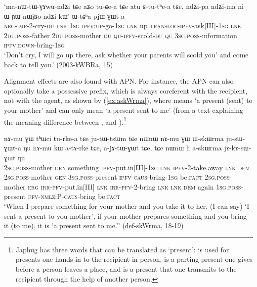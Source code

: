 \begin{exe}
\ex \label{ex:WtCha.pjWGWta}
\gll `ma-nɯ-tɯ-ɣɤwu-ndʑi tɕe aʑo tu-ɕe-a tɕe atu ɕ-tu-tʰe-a tɕe,
ndʑi-pa ndʑi-ma ni ɯ-ɲɯ-nɯjʁo-ndʑi kɯ' ɯ-tɕʰa pjɯ-ɣɯt-a \\
\textsc{neg}-\textsc{imp}-2-cry-\textsc{du} \textsc{lnk} \textsc{1sg} \textsc{ipfv}:\textsc{up}-go-\textsc{1sg} \textsc{lnk} up \textsc{transloc}-\textsc{ipfv}-ask[III]-\textsc{1sg} \textsc{lnk} \textsc{2du}.\textsc{poss}-father \textsc{2du}.\textsc{poss}-mother \textsc{du} \textsc{qu}-\textsc{ipfv}-scold-\textsc{du} \textsc{qu} \textsc{3sg}.\textsc{poss}-information \textsc{ipfv}:\textsc{down}-bring-\textsc{1sg} \\
\glt `Don't cry, I will go up there, ask whether your parents will scold you' and come back to tell you.' (2003-kWBRa, 15)
\end{exe}

Alignment effects are also found with APN. For instance, the APN  can also optionally take a possessive prefix, which is always coreferent with the recipient, not with the agent, as shown by (\ref{ex:askWrma}), where  means `a present (sent) to your mother' and  can only mean `a present sent to me' (from a text explaining the meaning difference between ,  and ).\footnote{Japhug has three words that can be translated as `present':  is used for presents one hands in to the recipient in person,  is a parting present one gives before a person leaves a place, and  is a present that one transmits to the recipient through the help of another person.}

\begin{exe}
\ex \label{ex:askWrma}
\gll nɤ-mu ɣɯ tʰɯci tu-rke-a tɕe ju-tɯ-tsɯm tɕe nɯnɯ nɤ-mu ɣɯ ɯ-skɯrma ju-sɯ-ɣɯt-a ŋu nɤ-mu kɯ a-tɤ-rke tɕe, a-jɤ-tɯ-ɣɯt tɕe, tɕe nɯnɯ li a-skɯrma jɤ-kɤ-sɯ-ɣɯt ŋu \\
\textsc{2sg}.\textsc{poss}-mother \textsc{gen} something \textsc{ipfv}-put.in[III]-\textsc{1sg} \textsc{lnk} \textsc{ipfv}-2-take.away \textsc{lnk} \textsc{dem} \textsc{2sg}.\textsc{poss}-mother \textsc{gen} \textsc{3sg}.\textsc{poss}-present  \textsc{ipfv}-\textsc{caus}-bring-\textsc{1sg} be:\textsc{fact} \textsc{2sg}.\textsc{poss}-mother  \textsc{erg} \textsc{irr}-\textsc{pfv}-put.in[III] \textsc{lnk} \textsc{irr}-\textsc{pfv}-2-bring \textsc{lnk} \textsc{lnk} \textsc{dem} again \textsc{1sg}.\textsc{poss}-present \textsc{pfv}-\textsc{nmlz}:P-\textsc{caus}-bring be:\textsc{fact} \\
\glt `When I prepare something for your mother and you take it to her, (I can say) `I sent a present to you mother', if your mother prepares something and you bring it (to me), it is `a present sent to me.'' (def-skWrma, 18-19)
\end{exe}
 

